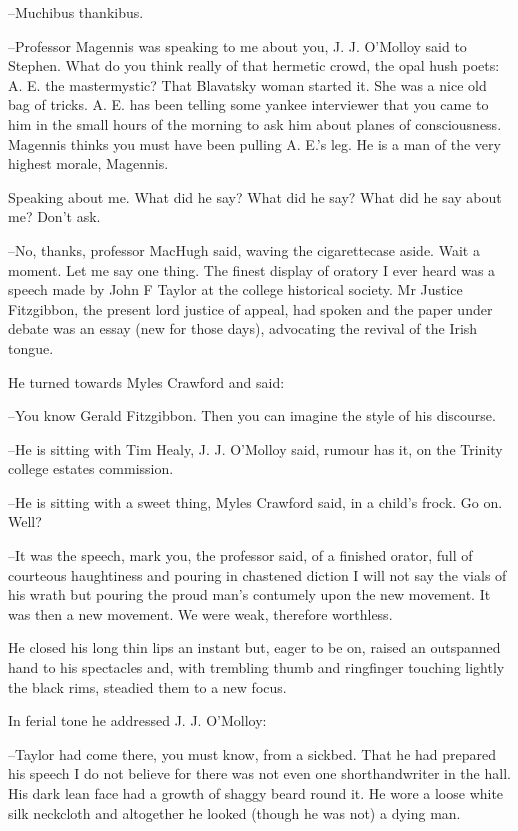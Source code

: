 --Muchibus thankibus.



--Professor Magennis was speaking to me about you, J. J. O'Molloy said to
Stephen. What do you think really of that hermetic crowd, the opal hush
poets: A. E. the mastermystic? That Blavatsky woman started it. She was a
nice old bag of tricks. A. E. has been telling some yankee interviewer
that you came to him in the small hours of the morning to ask him about
planes of consciousness. Magennis thinks you must have been pulling
A. E.'s leg. He is a man of the very highest morale, Magennis.

Speaking about me. What did he say? What did he say? What did he
say about me? Don't ask.

--No, thanks, professor MacHugh said, waving the cigarettecase aside.
Wait a moment. Let me say one thing. The finest display of oratory I ever
heard was a speech made by John F Taylor at the college historical
society. Mr Justice Fitzgibbon, the present lord justice of appeal, had
spoken and the paper under debate was an essay (new for those days),
advocating the revival of the Irish tongue.

He turned towards Myles Crawford and said:

--You know Gerald Fitzgibbon. Then you can imagine the style of his
discourse.

--He is sitting with Tim Healy, J. J. O'Molloy said, rumour has it, on
the Trinity college estates commission.

--He is sitting with a sweet thing, Myles Crawford said, in a child's
frock. Go on. Well?

--It was the speech, mark you, the professor said, of a finished orator,
full of courteous haughtiness and pouring in chastened diction I will not
say the vials of his wrath but pouring the proud man's contumely upon the
new movement. It was then a new movement. We were weak, therefore
worthless.

He closed his long thin lips an instant but, eager to be on, raised an
outspanned hand to his spectacles and, with trembling thumb and
ringfinger touching lightly the black rims, steadied them to a new focus.



In ferial tone he addressed J. J. O'Molloy:

--Taylor had come there, you must know, from a sickbed. That he had
prepared his speech I do not believe for there was not even one
shorthandwriter in the hall. His dark lean face had a growth of shaggy
beard round it. He wore a loose white silk neckcloth and altogether he
looked (though he was not) a dying man.

